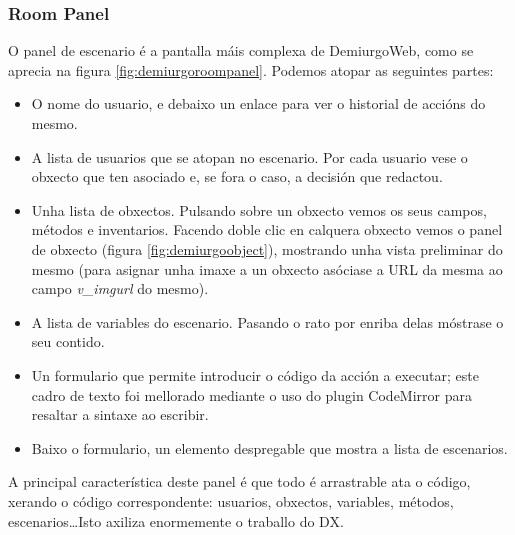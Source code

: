 \subsubsection{Room Panel}
O panel de escenario é a pantalla máis complexa de DemiurgoWeb, como se aprecia
na figura \ref{fig:demiurgoroompanel}. Podemos atopar as seguintes partes:
\begin{itemize}
  \item O nome do usuario, e debaixo un enlace para ver o historial de accións
  do mesmo.
  \item A lista de usuarios que se atopan no escenario. Por cada usuario vese o
  obxecto que ten asociado e, se fora o caso, a decisión que redactou.
  \item Unha lista de obxectos. Pulsando sobre un obxecto vemos os seus campos,
  métodos e inventarios. Facendo doble clic en calquera obxecto vemos o panel de
  obxecto (figura \ref{fig:demiurgoobject}), mostrando unha vista preliminar do
  mesmo (para asignar unha imaxe a un obxecto asóciase a URL da mesma ao
  campo \textit{v\_imgurl} do mesmo).
  \item A lista de variables do escenario. Pasando o rato por enriba delas
  móstrase o seu contido.
  \item Un formulario que permite introducir o código da acción a executar; este
  cadro de texto foi mellorado mediante o uso do plugin CodeMirror para resaltar
  a sintaxe ao escribir.
  \item Baixo o formulario, un elemento despregable que mostra a lista de
  escenarios.
\end{itemize}
A principal característica deste panel é que todo é arrastrable ata o código,
xerando o código correspondente: usuarios, obxectos, variables, métodos,
escenarios\ldots Isto axiliza enormemente o traballo do DX.

